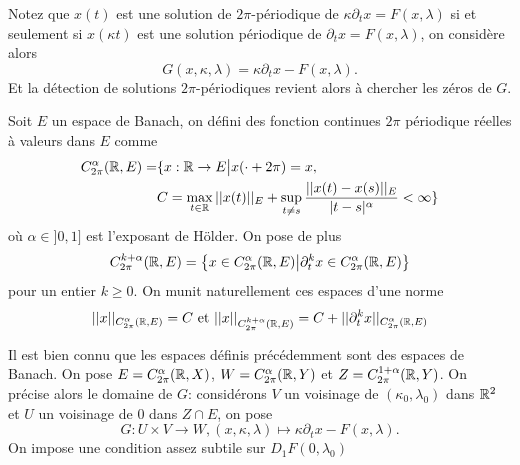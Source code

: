 \documentclass[memoire.tex]{subfiles}
\begin{document}
Notez que $x(t)$ est une solution de $2\pi$-périodique de $\kappa\partial_t x=F(x,\lambda)$ si et seulement si $x(\kappa t)$ est une solution périodique de $\partial_t x=F(x,\lambda)$, on considère alors
\begin{equation*}
    G(x,\kappa,\lambda)=\kappa \partial_t x-F(x,\lambda).
\end{equation*}
Et la détection de solutions $2\pi$-périodiques revient alors à chercher les zéros de $G$. 
\begin{definition}
    Soit $E$ un espace de Banach, on défini  des fonction continues $2\pi$ périodique réelles à valeurs dans $E$ comme
    \begin{align*}
        C^{\alpha}_{2\pi}(\mathbb{R},E)=&\{ x:\mathbb{R}\rightarrow E\big| x(\cdot+2\pi)=x,\\
        &C=\max_{t\in\mathbb{R}} ||x(t)||_{E}+\sup_{t\neq s} \frac{||x(t)-x(s)||_{E}}{|t-s|^{\alpha}}<\infty \}
    \end{align*}
    où $\alpha\in ]0,1]$ est l'exposant de Hölder. On pose de plus 
    \begin{equation*}
        C^{k+\alpha}_{2\pi}(\mathbb{R},E)=\left\{x\in  C^{\alpha}_{2\pi}(\mathbb{R},E)\big|\partial^k_tx\in C^{\alpha}_{2\pi}(\mathbb{R},E)\right\}
    \end{equation*}
    pour un entier $k\geq 0$. On munit naturellement ces espaces d'une norme
    \begin{equation*}
        ||x||_{C^{\alpha}_{2\pi}(\mathbb{R},E)}=C\text{ et }||x||_{C^{k+\alpha}_{2\pi}(\mathbb{R},E)}=C+||\partial^k_tx||_{C^{\alpha}_{2\pi}(\mathbb{R},E)}
    \end{equation*}
\end{definition}
    Il est bien connu que les espaces définis précédemment sont des espaces de Banach. On pose $E=C^{\alpha}_{2\pi}(\mathbb{R},X)$, $W=C^{\alpha}_{2\pi}(\mathbb{R},Y)$ et  $Z=C^{1+\alpha}_{2\pi}(\mathbb{R},Y)$.  On précise alors le domaine de $G$: considérons $V$ un voisinage de $(\kappa_0,\lambda_0)$ dans $\mathbb{R}^2$
    et $U$ un voisinage de $0$ dans $Z\cap E$, on pose
    \begin{equation*}
        G: U\times V\rightarrow W, (x,\kappa,\lambda)\mapsto \kappa \partial_t x-F(x,\lambda).
    \end{equation*}
    On impose une condition assez subtile sur $D_1F(0,\lambda_0)$
\end{document}

